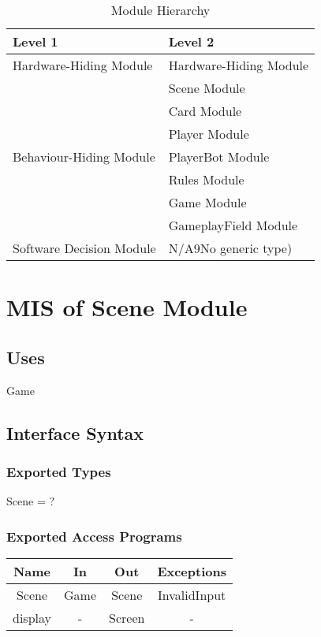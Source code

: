 \documentclass[12pt, titlepage]{article}
\begin{document}
\begin{table}[h!]
\centering
\begin{tabular}{p{} p{}}
\toprule
\textbf{Level 1} & \textbf{Level 2}\\
\midrule

\multirow{1}{0.3\textwidth}{Hardware-Hiding Module} & Hardware-Hiding Module \\
\midrule

\multirow{7}{0.3\textwidth}{Behaviour-Hiding Module} & Scene Module\\
& Card Module\\
& Player Module\\
& PlayerBot Module\\
& Rules Module\\
& Game Module\\
& GameplayField Module\\
\midrule

\multirow{1}{0.3\textwidth}{Software Decision Module} & N/A9No generic type)\\
\bottomrule

\end{tabular}
\caption{Module Hierarchy}
\label{TblMH}
\end{table}

\section{MIS of Scene Module}
\subsection{Uses}
Game
\subsection{Interface Syntax}
\subsubsection{Exported Types}
Scene = ?
\subsubsection{Exported Access Programs}
\begin{tabular}[pos]{|c|c|c|c|}
\hline
\textbf{Name}& \textbf{In} & \textbf{Out} & \textbf{Exceptions} \\ \hline
 Scene & Game  & Scene  &InvalidInput \\ 
\hline
 display & - & Screen & - \\
 \hline
\end{tabular}
\end{document}
